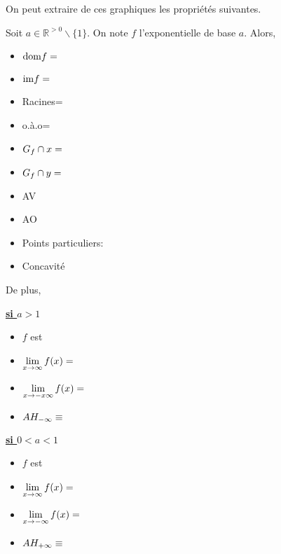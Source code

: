 \documentclass[a4paper,12pt,singlepage]{report}
\newcommand{\IR}{\mathbb{R}}
\newcommand{\dom}{\mathrm{dom}}
\newcommand{\im}{\mathrm{im}}
\begin{document}
On peut extraire de ces graphiques les propriétés suivantes.
\begin{propriete}
Soit \(a\in\IR^{>0}\backslash\{1\}\). On note \(f\) l'exponentielle de
base \(a\). Alors,

\par \setlength{\columnseprule}{2 pt}
          \begin{minipage}[t]{\linewidth}
          \begin{multicols}{2}
\begin{itemize}
\item \(\dom{f}=\dotfill\)
\item \(\im{f}=\dotfill\)
\item Racines=\dotfill
\item o.à.o=\dotfill
\item \(G_f\cap x=\dotfill\)
\item \(G_f\cap y=\dotfill\)
\item AV\dotfill
\item AO\dotfill
\item Points particuliers:\dotfill
\item Concavité \dotfill
\end{itemize}


\end{multicols}\end{minipage}

De plus,
\par \setlength{\columnseprule}{2 pt}
          \begin{minipage}[t]{\linewidth}
          \begin{multicols}{2}
\uline{\textbf{si \(a>1\)}}
\begin{itemize}
\item \(f\) est \dotfill
\item \(\lim\limits_{x\to\infty}f(x)=\dotfill\)
\item \(\lim\limits_{x\to-x\infty}f(x)=\dotfill\)
\item \(AH_{-\infty}\equiv\dotfill\)
\end{itemize}

\columnbreak
 \uline{\textbf{si \(0<a<1\)}}
\begin{itemize}
\item \(f\) est \dotfill
\item \(\lim\limits_{x\to\infty}f(x)=\dotfill\)
\item \(\lim\limits_{x\to-\infty}f(x)=\dotfill\)
\item \(AH_{+\infty}\equiv\dotfill\)
\end{itemize}


\end{multicols}\end{minipage}
\end{propriete}
\end{document}
